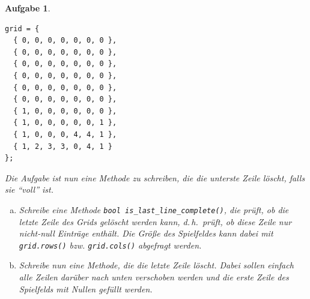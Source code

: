 \documentclass[a4paper,12pt,parskip=full]{scrartcl}
\theoremstyle{exercise}
\newtheorem{exercise}{Aufgabe}
\begin{document}
\begin{exercise}
\begin{multicols}{2}
    \begin{lstlisting}
grid = {
  { 0, 0, 0, 0, 0, 0, 0 },
  { 0, 0, 0, 0, 0, 0, 0 },
  { 0, 0, 0, 0, 0, 0, 0 },
  { 0, 0, 0, 0, 0, 0, 0 },
  { 0, 0, 0, 0, 0, 0, 0 },
  { 0, 0, 0, 0, 0, 0, 0 },
  { 1, 0, 0, 0, 0, 0, 0 },
  { 1, 0, 0, 0, 0, 0, 1 },
  { 1, 0, 0, 0, 4, 4, 1 },
  { 1, 2, 3, 3, 0, 4, 1 }
};
    \end{lstlisting}
  \end{multicols}
  Die Aufgabe ist nun eine Methode zu schreiben, die die unterste Zeile löscht,
  falls sie ``voll'' ist.
  \begin{enumerate}[a)]
  \item Schreibe eine Methode \lstinline|bool is_last_line_complete()|, die prüft,
    ob die letzte Zeile des Grids gelöscht werden kann, d.\,h.\ prüft, ob diese
    Zeile nur nicht-null Einträge enthält. Die Größe des Spielfeldes kann dabei
    mit \lstinline|grid.rows()| bzw. \lstinline|grid.cols()| abgefragt werden.
  \item Schreibe nun eine Methode, die die letzte Zeile löscht. Dabei sollen einfach
    alle Zeilen darüber nach unten verschoben werden und die erste Zeile des
    Spielfelds mit Nullen gefüllt werden.
  \end{enumerate}
\end{exercise}
\end{document}

